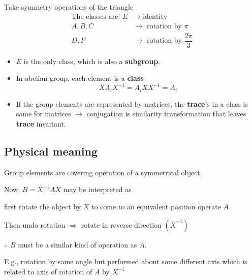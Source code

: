 \begin{example*}
Take symmetry operations of the triangle
\begin{align*}
\text{The classes are: } E &\to \text{ identity}\\
A,B,C &\to \text{ rotation by }\pi\\
D,F &\to \text{ rotation by } \dfrac{2\pi}{3}
\end{align*}
\begin{itemize}
\item $E$ is the only class, which is also a {\bf subgroup}.

\item In abelian group, each element is  a {\bf class}
$$
XA_{i}X^{-1}=A_{i}XX^{-1}=A_{i}
$$

\item If the group elements are represented by matrices, the {\bf trace}'s in a class is same for matrices $\to$ conjugation is similarity transformation that leaves {\bf trace} invariant.
\end{itemize}
\end{example*}

\subsection*{Physical meaning}

Group elements are covering operation of a symmetrical object.

Now, $B=X^{-1}AX$ may be interpreted as 

first rotate the object by $X$ to come to an equivalent position operate $A$

Then undo rotation $\Rightarrow$ rotate in reverse direction $(\overline{X}^{-1})$

$\therefore$ $B$ must be a similar kind of operation as $A$.

E.g., rotation by same angle but performed about some different axis which is related to axis of rotation of $A$ by $X^{-1}$

